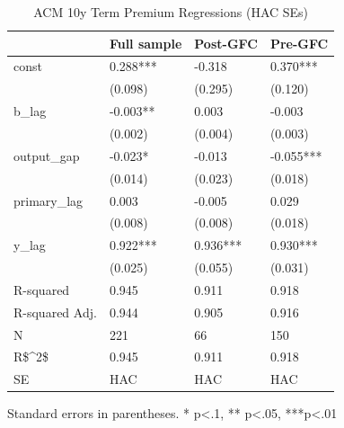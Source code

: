 \begin{table}
\caption{ACM 10y Term Premium Regressions (HAC SEs)}
\label{}
\begin{center}
\begin{tabular}{llll}
\hline
               & Full sample & Post-GFC & Pre-GFC    \\
\hline
const          & 0.288***    & -0.318   & 0.370***   \\
               & (0.098)     & (0.295)  & (0.120)    \\
b\_lag         & -0.003**    & 0.003    & -0.003     \\
               & (0.002)     & (0.004)  & (0.003)    \\
output\_gap    & -0.023*     & -0.013   & -0.055***  \\
               & (0.014)     & (0.023)  & (0.018)    \\
primary\_lag   & 0.003       & -0.005   & 0.029      \\
               & (0.008)     & (0.008)  & (0.018)    \\
y\_lag         & 0.922***    & 0.936*** & 0.930***   \\
               & (0.025)     & (0.055)  & (0.031)    \\
R-squared      & 0.945       & 0.911    & 0.918      \\
R-squared Adj. & 0.944       & 0.905    & 0.916      \\
N              & 221         & 66       & 150        \\
R\$^2\$        & 0.945       & 0.911    & 0.918      \\
SE             & HAC         & HAC      & HAC        \\
\hline
\end{tabular}
\end{center}
\end{table}
\bigskip
Standard errors in parentheses. \newline 
* p<.1, ** p<.05, ***p<.01